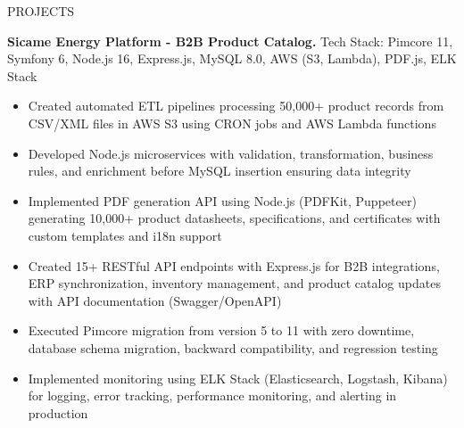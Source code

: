 \documentclass{resume} %
\begin{document}
\begin{rSection}{PROJECTS}
\item \textbf{Sicame Energy Platform - B2B Product Catalog.} {Tech Stack: Pimcore 11, Symfony 6, Node.js 16, Express.js, MySQL 8.0, AWS (S3, Lambda), PDF.js, ELK Stack}
\begin{itemize}
    \itemsep -3pt {}
    \item Created automated ETL pipelines processing 50,000+ product records from CSV/XML files in AWS S3 using CRON jobs and AWS Lambda functions
    \item Developed Node.js microservices with validation, transformation, business rules, and enrichment before MySQL insertion ensuring data integrity
    \item Implemented PDF generation API using Node.js (PDFKit, Puppeteer) generating 10,000+ product datasheets, specifications, and certificates with custom templates and i18n support
    \item Created 15+ RESTful API endpoints with Express.js for B2B integrations, ERP synchronization, inventory management, and product catalog updates with API documentation (Swagger/OpenAPI)
    \item Executed Pimcore migration from version 5 to 11 with zero downtime, database schema migration, backward compatibility, and regression testing
    \item Implemented monitoring using ELK Stack (Elasticsearch, Logstash, Kibana) for logging, error tracking, performance monitoring, and alerting in production
\end{itemize}


\end{rSection}
\end{document}
